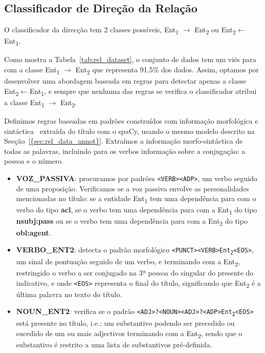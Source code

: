 \documentclass[a4paper, twocolumn, 11pt, twoside]{article}
\begin{document}
\subsection{Classificador de Direção da Relação}
\label{subsec:rel_direction}

O classificador da direcção tem 2 classes possíveis, Ent\textsubscript{1} $\rightarrow$ Ent\textsubscript{2} ou Ent\textsubscript{2}$\leftarrow$Ent\textsubscript{1}. 

Como mostra a Tabela~\ref{tab:rel_dataset}, o conjunto de dados tem um viés para com a classe Ent\textsubscript{1} $\rightarrow$ Ent\textsubscript{2} que representa 91,5\% dos dados. Assim, optamos por desenvolver uma abordagem baseada em regras para detectar apenas a classe Ent\textsubscript{2}$\leftarrow$Ent\textsubscript{1}, e sempre que nenhuma das regras se verifica o classificador atribui a classe Ent\textsubscript{1} $\rightarrow$ Ent\textsubscript{2}.

Definimos regras baseadas em padrões construídos com informação morfológica e sintáctica~\citep{nivre-etal-2020-universal} extraída do título com o spaCy, usando o mesmo modelo descrito na Secção~\ref{{sec:rel_data_annot}}. Extraímos a informação morfo-sintáctica de todas as palavras, incluindo para os verbos informação sobre a conjugação: a pessoa e o número.

\begin{itemize}

\item \textbf{VOZ\_PASSIVA}: procuramos por padrões \texttt{<VERB><ADP>}, um verbo seguido de uma proposição. Verificamos se a voz passiva envolve as personalidades mencionadas no título: se a entidade Ent\textsubscript{1} tem uma dependência para com o verbo do tipo \textbf{acl}, se o verbo tem uma dependência para com a Ent\textsubscript{1} do tipo \textbf{nsubj:pass} ou se o verbo tem uma dependência para com a Ent\textsubscript{2} do tipo \textbf{obl:agent}. 

\item \textbf{VERBO\_ENT2}: detecta o padrão morfológico \texttt{<PUNCT><VERB>Ent\textsubscript{2}<EOS>}, um sinal de pontuação seguido de um verbo, e terminando com a Ent\textsubscript{2}, restringido o verbo a ser conjugado na 3ª pessoa do singular do presente do indicativo, e onde \texttt{<EOS>} representa o final do título, significando que Ent\textsubscript{2} é a última palavra no texto do título.

\item \textbf{NOUN\_ENT2}: verifica se o padrão \texttt{<ADJ>?<NOUN><ADJ>?<ADP>Ent\textsubscript{2}<EOS>} está presente no título, i.e.: um substantivo podendo ser precedido ou sucedido de um ou mais adjectivos terminando com a Ent\textsubscript{2}, sendo que o substantivo é restrito a uma lista de substantivos pré-definida.
\end{itemize}
\end{document}
